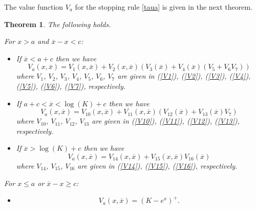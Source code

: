 \documentclass[10pt,a4paper]{amsart}
\newtheorem{Thm}{Theorem}
\begin{document}
	The value function $V_a$ for the stopping rule \eqref{taua} is given in the next theorem.

	\begin{Thm}\label{valuea}
		The following holds.
		
		For $x > a$ and $\overline{x} - x < c$:
		\begin{itemize}
			\item[(i)]
			If $\overline{x} < a+c$ then we have
			\[V_a(x,\overline{x})= V_1(x,\overline{x}) + V_2(x,\overline{x}) ( V_3(\overline{x}) +  V_4(\overline{x})(  V_5 + V_6 V_7  )   )\]
			where  $V_1$, $V_2$, $V_3$, $V_4$, $V_5$, $V_6$, $V_7$ are given in (\ref{V1}), (\ref{V2}), (\ref{V3}), (\ref{V4}), (\ref{V5}), (\ref{V6}), (\ref{V7}), respectively.
			\item[(ii)] If $a+c < \overline{x} < \log(K)+c$ then we have
			\[V_a(x,\overline{x})= V_{10}(x,\overline{x}) + V_{11}(x,\overline{x}) ( V_{12}(\overline{x}) +  V_{13}(\overline{x})V_7   )\]
			where  $V_{10}$, $V_{11}$, $V_{12}$, $V_{13}$ are given in (\ref{V10}), (\ref{V11}), (\ref{V12}), (\ref{V13}), respectively.
			\item[(iii)] If $\overline{x} > \log(K)+c$ then we have
			\[V_a(x,\overline{x})= V_{14}(x,\overline{x}) + V_{15}(x,\overline{x}) V_{16}(\overline{x})\]
			where  $V_{14}$, $V_{15}$, $V_{16}$ are given in (\ref{V14}), (\ref{V15}), (\ref{V16}), respectively.
		\end{itemize}
		For $x \leq a$ or $\overline{x} - x \geq c$:
		\begin{itemize}
			\item[(iv)] \[V_a(x,\overline{x})= \left( K - e^x\right)^+. \]
		\end{itemize}
	\end{Thm}
\end{document}
